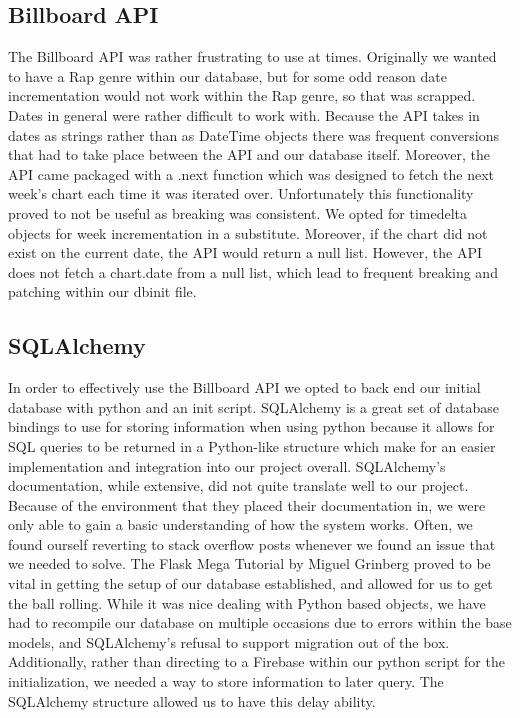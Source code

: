 \documentclass{article}
\begin{document}
\subsection*{Billboard API}
The Billboard API was rather frustrating to use at times.
Originally we wanted to have a Rap genre within our database, but for some odd reason date incrementation would not work within the Rap genre, so that was scrapped.
Dates in general were rather difficult to work with.
Because the API takes in dates as strings rather than as DateTime objects there was frequent conversions that had to take place between the API and our database itself.
Moreover, the API came packaged with a .next function which was designed to fetch the next week's chart each time it was iterated over.
Unfortunately this functionality proved to not be useful as breaking was consistent.
We opted for timedelta objects for week incrementation in a substitute. 
Moreover, if the chart did not exist on the current date, the API would return a null list.
However, the API does not fetch a chart.date from a null list, which lead to frequent breaking and patching within our dbinit file. 
\subsection*{SQLAlchemy}
In order to effectively use the Billboard API we opted to back end our initial database with python and an init script. SQLAlchemy is a great set of database bindings to use for storing information when using python because it allows for SQL queries to be returned in a Python-like structure which make for an easier implementation and integration into our project overall.
SQLAlchemy's documentation, while extensive, did not quite translate well to our project.
Because of the environment that they placed their documentation in, we were only able to gain a basic understanding of how the system works.
Often, we found ourself reverting to stack overflow posts whenever we found an issue that we needed to solve.
The Flask Mega Tutorial by Miguel Grinberg proved to be vital in getting the setup of our database established, and allowed for us to get the ball rolling.
While it was nice dealing with Python based objects, we have had to recompile our database on multiple occasions due to errors within the base models, and SQLAlchemy's refusal to support migration out of the box.
Additionally, rather than directing to a Firebase within our python script for the initialization, we needed a way to store information to later query. 
The SQLAlchemy structure allowed us to have this delay ability. 
\end{document}
